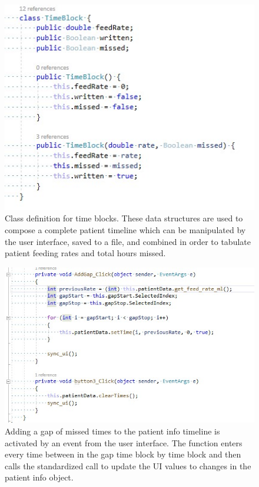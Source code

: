 \documentclass[onecolumn, draftclsnofoot,10pt, compsoc]{IEEEtran}
\begin{document}
\begin{figure}[htp]
    \centering
    \includegraphics[width=13cm]{timeblock}
    \caption{Class definition for time blocks. These data structures are used to compose a complete patient timeline which can be manipulated by the user interface, saved to a file, and combined in order to tabulate patient feeding rates and total hours missed.}
    \label{fig:Timeblock}
\end{figure}

\begin{figure}[htp]
    \centering
    \includegraphics[width=16cm]{buttoncode}
    \caption{Adding a gap of missed times to the patient info timeline is activated by an event from the user interface. The function enters every time between in the gap time block by time block and then calls the standardized call to update the UI values to changes in the patient info object.}
    \label{fig:ButtonCode1}
\end{figure}
\end{document}
